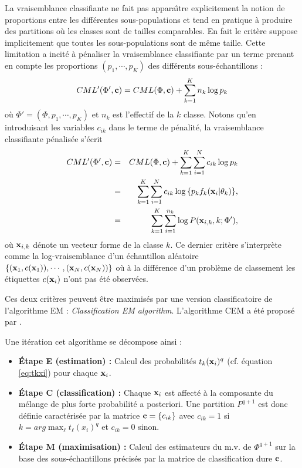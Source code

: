 La vraisemblance classifiante ne fait pas appara\^{\i}tre explicitement
la notion de proportions entre les diff\'erentes sous-populations
et tend en pratique \`a produire des
partitions o\`u les classes sont de tailles comparables. En fait
le crit\`ere suppose implicitement que toutes les sous-populations
sont de m\^eme taille. Cette limitation
a incit\'e  \`a p\'enaliser la vraisemblance classifiante
par un terme prenant en compte les proportions $(p_1,\cdots,p_K)$ des
diff\'erents sous-\'echantillons :
\begin{equation}
CML'(\Phi',\mbox{\bf c})=CML(\Phi, \mbox{\bf c})+ \sum_{k=1}^K n_k \log{p_k}
\end{equation}
o\`u $\Phi'=(\Phi,p_1,\cdots,p_K)$ et $n_k$ est l'effectif de la $k$\ieme
classe.
Notons qu'en introduisant les variables $c_{ik}$ dans le terme de p\'enalit\'e,
la vraisemblance classifiante p\'enalis\'ee s'\'ecrit
\begin{eqnarray*}
CML'(\Phi',\mbox{\bf c}) & = & CML(\Phi, \mbox{\bf c} ) + \sum_{k=1}^K \sum_{i=1}^N c_{ik} \log{p_k}\\
             & = &\sum_{k=1}^K \sum_{i=1}^N c_{ik} \log{\{ p_k f_k( \mbox{\bf x}_i | \theta_k ) \} },\\
             & = &\sum_{k=1}^K \sum_{i=1}^{n_k} \log  P(\mbox{\bf x}_{i,k}, k; \Phi'),
\end{eqnarray*}
o\`u $\mbox{\bf x}_{i,k}$ d\'enote un vecteur forme de la classe $k$. Ce dernier crit\`ere
s'interpr\`ete comme la log-vraisemblance d'un \'echantillon al\'eatoire
$\{(\mbox{\bf x}_1,c(\mbox{\bf x}_1)),\cdots,(\mbox{\bf x}_N,c(\mbox{\bf x}_N))\}$ o\`u  \`a la diff\'erence d'un probl\`eme de
classement les \'etiquettes $c(\mbox{\bf x}_i)$ n'ont pas \'et\'e observ\'ees. 

Ces deux crit\`eres peuvent \^etre maximis\'es par une version classificatoire
de l'algorithme EM : {\em Classification EM algorithm}. L'algorithme CEM
a \'et\'e propos\'e par . 

Une it\'eration cet algorithme se d\'ecompose ainsi :
\begin{itemize}
\item {\bf \'Etape E (estimation) :} Calcul des probabilit\'es $t_k(\mbox{\bf x}_i)^q$
(cf. \'equation \ref{eq:tkxi}) pour
chaque $\mbox{\bf x}_i$.

\item {\bf \'Etape C (classification) :} Chaque $\mbox{\bf x}_i$ est affect\'e \`a la 
composante du m\'elange de plus forte probabilit\'e a posteriori. Une partition
$P^{q+1}$ est donc d\'efinie caract\'eris\'ee par la matrice $\mbox{\bf c}=\{ c_{ik} \}$ avec
$c_{ik}=1$ si $k=arg \max_\ell{ t_\ell(x_i)^q}$ et $c_{ik}=0$ sinon.

\item {\bf \'Etape M (maximisation) :} Calcul des estimateurs du m.v. de 
$\Phi^{q+1}$ sur la base des sous-\'echantillons pr\'ecis\'es par la matrice
de classification dure $\mbox{\bf c}$.
\end{itemize}

